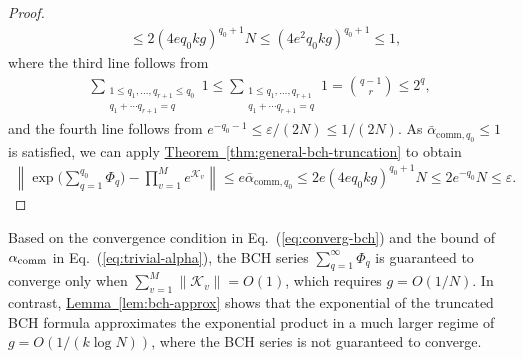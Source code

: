\documentclass[aps,pra,reprint,groupedaddress,floatfix]{revtex4-2}
\newcommand{\eq}[1]{(\ref{eq:#1})}
\newcommand{\thm}[1]{\hyperref[thm:#1]{Theorem~\ref*{thm:#1}}}
\newcommand{\lem}[1]{\hyperref[lem:#1]{Lemma~\ref*{lem:#1}}}
\renewcommand{\comm}{\mathrm{comm}}
\newcommand{\eps}{\varepsilon}
\newcommand{\mc}{\mathcal}
\begin{document}
\begin{proof}
\begin{align*}
    &\le 2(4eq_0kg)^{q_0+1}N \le (4e^2q_0 kg)^{q_0+1}\le 1,
\end{align*}
where the third line follows from 
\begin{align*}
    \sum_{\substack{1\le q_1, \ldots, q_{r+1}\le q_0\\q_1+\cdots q_{r+1}=q}}1\le  \sum_{\substack{1\le q_1, \ldots, q_{r+1}\\q_1+\cdots q_{r+1}=q}}1=\binom{q-1}{r}\le 2^q,
\end{align*}
and the fourth line follows from $e^{-q_0-1} \le \eps/(2N) \le 1/(2N)$.
As $\bar{\alpha}_{\comm,q_0}\le 1$ is satisfied, we can apply \thm{general-bch-truncation} to obtain 
\begin{align*}
\left\|\exp\Big(\sum_{q=1}^{q_0} \Phi_q\Big) - \prod_{v = 1}^Me^{\mc K_v} \right\|
\le  e\bar{\alpha}_{\comm,q_0}
\le 2e(4eq_0kg)^{q_0+1}N\le 2e^{-q_0}N\le \eps.
\end{align*}
\end{proof}
Based on the convergence condition in Eq.~\eq{converg-bch} and the bound of $\alpha_{\rm comm}$ in Eq.~\eq{trivial-alpha}, the BCH series $\sum_{q=1}^{\infty} \Phi_q$ is guaranteed to converge only when $\sum_{v=1}^M \|\mc K_v\| = O(1)$, which requires $g = O(1/N)$. In contrast, \lem{bch-approx}  shows that the exponential of the truncated BCH formula approximates the exponential product in a much larger regime of $g = O(1/(k\log N))$, where the BCH series is not guaranteed to converge. 

\end{document}
